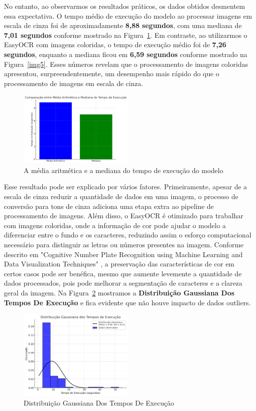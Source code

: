 \documentclass[conference]{IEEEtran}
\begin{document}
No entanto, ao observarmos os resultados práticos, os dados obtidos desmentem essa expectativa. O tempo médio de execução do modelo ao processar imagens em escala de cinza foi de aproximadamente \textbf{8,88 segundos}, com uma mediana de \textbf{7,01 segundos} conforme mostrado na Figura~\ref{img8}. Em contraste, ao utilizarmos o EasyOCR com imagens coloridas, o tempo de execução médio foi de \textbf{7,26 segundos}, enquanto a mediana ficou em \textbf{6,59 segundos} conforme mostrado na Figura~\ref{img5}. Esses números revelam que o processamento de imagens coloridas apresentou, surpreendentemente, um desempenho mais rápido do que o processamento de imagens em escala de cinza.

\begin{figure}[htbp]
	\centerline{\includegraphics[width=0.5\textwidth]{img8.png}}
	\caption{A média aritmética e a mediana do tempo de execução do modelo}
	\label{img8}
\end{figure}

Esse resultado pode ser explicado por vários fatores. Primeiramente, apesar de a escala de cinza reduzir a quantidade de dados em uma imagem, o processo de conversão para tons de cinza adiciona uma etapa extra ao pipeline de processamento de imagens. Além disso, o EasyOCR é otimizado para trabalhar com imagens coloridas, onde a informação de cor pode ajudar o modelo a diferenciar entre o fundo e os caracteres, reduzindo assim o esforço computacional necessário para distinguir as letras ou números presentes na imagem. Conforme descrito em "Cognitive Number Plate Recognition using Machine Learning and Data Visualization Techniques" \cite{b6}, a preservação das características de cor em certos casos pode ser benéfica, mesmo que aumente levemente a quantidade de dados processados, pois pode melhorar a segmentação de caracteres e a clareza geral da imagem. Na Figura~\ref{img9} mostramos a \textbf{Distribuição Gaussiana Dos Tempos De Execução} e fica evidente que não houve impacto de dados outliers.

\begin{figure}[htbp]
	\centerline{\includegraphics[width=0.5\textwidth]{img9.png}}
	\caption{Distribuição Gaussiana Dos Tempos De Execução}
	\label{img9}
\end{figure}
\end{document}
